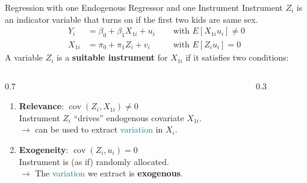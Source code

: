 \documentclass[11pt, aspectratio = 169]{beamer}
\begin{document}
\begin{frame}{Regression with one Endogenous Regressor and one Instrument}
Instrument $Z_i$ is an indicator variable that turns on if the first two kids are same sex.
\pause
\begin{align*}
    Y_{i} &= \beta_0 + \beta_1 X_{1i} + u_i \quad &\text{ with } E[X_{1i}u_i] \neq 0 
    \\
    X_{1i} &= \pi_0 + \pi_1 Z_i + v_{i } \quad &\text{ with } E[Z_iu_i] = 0 
\end{align*}
\pause
A variable $Z_i$ is a \textbf{suitable instrument} for $X_{1i}$ if it satisfies two conditions:
\pause
\begin{columns}[T]

\begin{column}{0.7\textwidth}

\begin{enumerate}
    \item \textcolor{mygold}{\textbf{Relevance}}: $ \operatorname{cov}(Z_i, X_{1i}) \neq 0 $ \\
          Instrument $Z_i$ ``drives'' endogenous covariate $X_{1i}$. \\
          $\rightarrow$ can be used to extract \textcolor{teal}{variation} in $X_i$.
    \item \textcolor{mypetrol}{\textbf{Exogeneity}}: $ \operatorname{cov}(Z_i, u_i) = 0 $ \\
          Instrument is (as if) randomly allocated. \\
          $\rightarrow$ The \textcolor{teal}{variation} we extract is \textbf{exogenous}.
\end{enumerate}

\end{column}

\begin{column}{0.3\textwidth}

\begin{center}
\vspace*{\fill}

\end{center}
\end{column}
\end{columns}
\end{frame}
\end{document}
